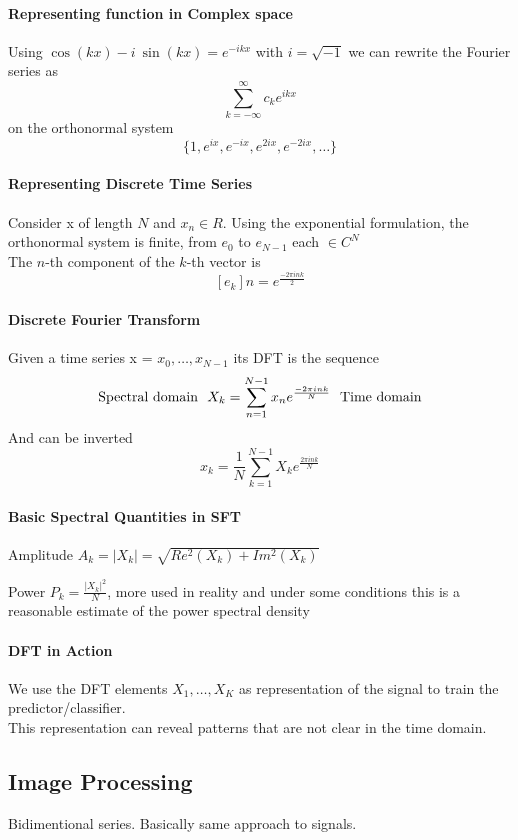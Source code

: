 \documentclass[10pt]{report}
\begin{document}
\paragraph{Representing function in Complex space} Using $\cos(kx)-i\:\sin(kx) = e^{-ikx}$ with $i=\sqrt{-1}$ we can rewrite the Fourier series as $$\sum_{k=-\infty}^\infty c_k e^{ikx}$$
on the orthonormal system $$\{1,e^{ix},e^{-ix},e^{2ix},e^{-2ix},\ldots\}$$
\paragraph{Representing Discrete Time Series} Consider x of length $N$ and $x_n\in R$. Using the exponential formulation, the orthonormal system is finite, from $e_0$ to $e_{N-1}$ each $\in C^N$\\
The $n$-th component of the $k$-th vector is $$[e_k]n=e^{\frac{-2\pi ink}{2}}$$
\paragraph{Discrete Fourier Transform} Given a time series x = $x_0,\ldots,x_{N-1}$ its DFT is the sequence $$\hbox{Spectral domain}\:\:\:X_k = \sum_{n=1}^{N-1}x_ne^{\frac{-2\pi ink}{N}}\:\:\:\hbox{Time domain}$$
And can be inverted $$x_k = \frac{1}{N}\sum_{k=1}^{N-1}X_ke^{\frac{2\pi ink}{N}}$$
\paragraph{Basic Spectral Quantities in SFT}
\begin{list}{}{}
	\item Amplitude $A_k = |X_k| = \sqrt{Re^2(X_k)+Im^2(X_k)}$
	\item Power $P_k = \frac{|X_k|^2}{N}$, more used in reality and under some conditions this is a reasonable estimate of the power spectral density
\end{list}
\paragraph{DFT in Action} We use the DFT elements $X_1,\ldots,X_K$ as representation of the signal to train the predictor/classifier.\\
This representation can reveal patterns that are not clear in the time domain.
\subsection{Image Processing}
Bidimentional series. Basically same approach to signals.
\end{document}
